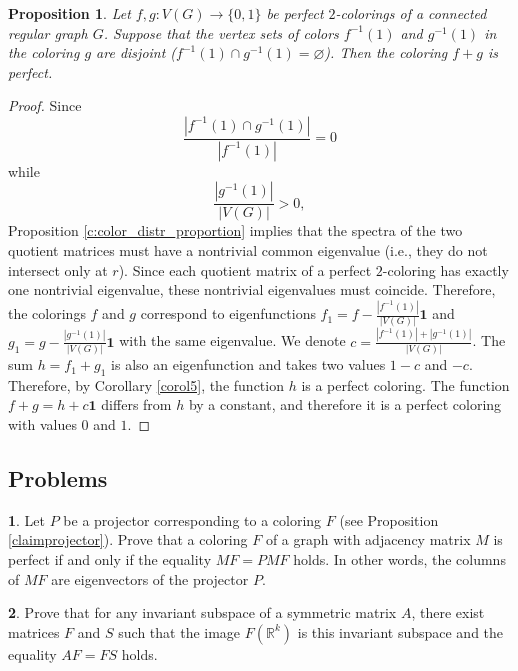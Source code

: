 \documentclass[11pt]{article}
\newtheorem{claim}{Proposition}[section]
\theoremstyle{definition}
\newtheorem{exercise}{\quad}
\begin{document}
\begin{claim}\label{PCclaim101}
Let $f,g:V(G)\rightarrow \{0,1\}$ be perfect $2$-colorings
of a connected regular graph $G$. Suppose that the vertex sets
of colors $f^{-1}(1)$ and  $g^{-1}(1)$ in the coloring
$g$ are disjoint ($f^{-1}(1)\cap g^{-1}(1) =\varnothing$). Then the coloring $f+g$
is perfect.
\end{claim}
\begin{proof}
Since
\[
\frac{|f^{-1}(1)\cap g^{-1}(1)|}{|f^{-1}(1)|}=0
\]
while
\[
\frac{|g^{-1}(1)|}{|V(G)|}>0,
\]
Proposition \ref{c:color_distr_proportion} implies that the spectra of the two quotient matrices
must have a nontrivial common eigenvalue (i.e., they do not intersect only at 
 $r$). Since each quotient matrix of a perfect $2$-coloring has exactly one nontrivial eigenvalue, these nontrivial eigenvalues must coincide.
Therefore, the colorings $f$ and $g$ correspond to eigenfunctions
$f_1=f-\frac{|f^{-1}(1)|}{|V(G)|}{\mathbf 1}$ and
$g_1=g-\frac{|g^{-1}(1)|}{|V(G)|}{\mathbf 1}$ with the same
eigenvalue. We denote
$c=\frac{|f^{-1}(1)|+|g^{-1}(1)|}{|V(G)|}$. The sum $h=f_1+g_1$ is also
an eigenfunction and takes two values $1-c$ and $-c$.
Therefore, by Corollary \ref{corol5}, the function $h$ is a perfect
coloring. The function $f+g=h+c{\mathbf 1}$ differs from $h$ by a
constant, and therefore it is a perfect coloring with
values $0$ and $1$.
\end{proof}

\subsection{Problems}

\begin{exercise}
Let $P$ be a projector corresponding to a coloring $F$  (see Proposition
\ref{claimprojector}). Prove that a coloring $F$ of a graph with adjacency matrix $M$
is perfect if and only if
the equality $MF=PMF$ holds. In other words, the columns of $MF$ are
eigenvectors of the projector $P$.
\end{exercise}

\begin{exercise}
Prove that for any invariant subspace of a symmetric
matrix $A$, there exist matrices $F$ and $S$ such that the image
$F(\mathbb{R}^k)$ is this invariant subspace and
the equality $AF=FS$ holds.
\end{exercise}
\end{document}
